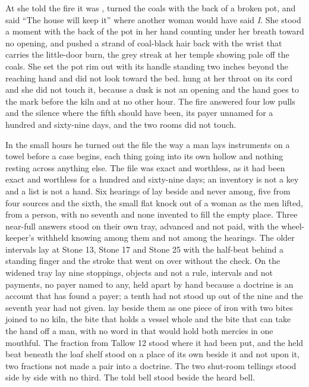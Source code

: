 At  she told the fire it was , turned the coals with the back of a broken pot, and said “The house will keep it” where another woman would have said \emph{I}. She stood a moment with the back of the pot in her hand counting under her breath toward no opening, and pushed a strand of coal-black hair back with the wrist that carries the little-door burn, the grey streak at her temple showing pale off the coals. She set the pot rim out with its handle standing two inches beyond the reaching hand and did not look toward the bed.  hung at her throat on its cord and she did not touch it, because a dusk is not an opening and the hand goes to the mark before the kiln and at no other hour. The fire answered four low pulls and the silence where the fifth should have been, its payer unnamed for a hundred and sixty-nine days, and the two rooms did not touch.

In the small hours he turned out the file the way a man lays instruments on a towel before a case begins, each thing going into its own hollow and nothing resting across anything else. The file was exact and worthless, as it had been exact and worthless for a hundred and sixty-nine days; an inventory is not a key and a list is not a hand. Six hearings of  lay beside and never among, five from four sources and the sixth, the small flat knock out of a woman as the men lifted, from a person, with no seventh and none invented to fill the empty place. Three near-full answers stood on their own tray, advanced and not paid, with the wheel-keeper's withheld knowing among them and not among the hearings. The older intervals lay at Stone 13, Stone 17 and Stone 25 with the half-beat behind a standing finger and the stroke that went on over  without the check. On the widened tray lay nine stoppings, objects and not a rule, intervals and not payments, no payer named to any, held apart by hand because a doctrine is an account that has found a payer; a tenth had not stood up out of the nine and the seventh year had not given.  lay beside them as one piece of iron with two bites joined to no kiln, the bite that holds a vessel whole and the bite that can take the hand off a man, with no word in  that would hold both mercies in one mouthful. The fraction from Tallow 12 stood where it had been put, and the held beat beneath the loaf shelf stood on a place of its own beside it and not upon it, two fractions not made a pair into a doctrine. The two shut-room tellings stood side by side with no third. The told bell stood beside the heard bell.

